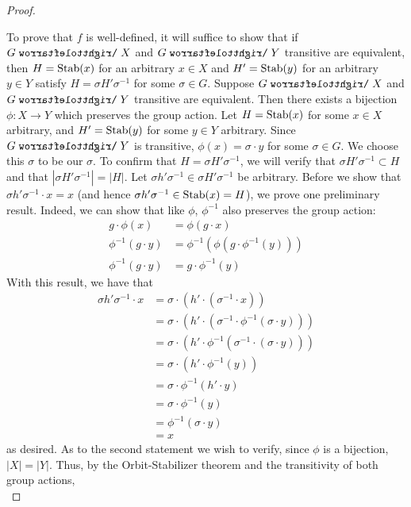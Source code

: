 \documentclass[../notes.tex]{subfiles}
\begin{document}
\begin{itemize}
\begin{proof}
\begin{enumerate}
        \end{enumerate}
        To prove that $f$ is well-defined, it will suffice to show that if $G\acts X$ and $G\acts Y$ transitive are equivalent, then $H=\operatorname{Stab}(x)$ for an arbitrary $x\in X$ and $H'=\operatorname{Stab}(y)$ for an arbitrary $y\in Y$ satisfy $H=\sigma H'\sigma^{-1}$ for some $\sigma\in G$. Suppose $G\acts X$ and $G\acts Y$ transitive are equivalent. Then there exists a bijection $\phi:X\to Y$ which preserves the group action. Let $H=\operatorname{Stab}(x)$ for some $x\in X$ arbitrary, and $H'=\operatorname{Stab}(y)$ for some $y\in Y$ arbitrary. Since $G\acts Y$ is transitive, $\phi(x)=\sigma\cdot y$ for some $\sigma\in G$. We choose this $\sigma$ to be our $\sigma$. To confirm that $H=\sigma H'\sigma^{-1}$, we will verify that $\sigma H'\sigma^{-1}\subset H$ and that $|\sigma H'\sigma^{-1}|=|H|$. Let $\sigma h'\sigma^{-1}\in\sigma H'\sigma^{-1}$ be arbitrary. Before we show that $\sigma h'\sigma^{-1}\cdot x=x$ (and hence $\sigma h'\sigma^{-1}\in\operatorname{Stab}(x)=H$), we prove one preliminary result. Indeed, we can show that like $\phi$, $\phi^{-1}$ also preserves the group action:
        \begin{align*}
            g\cdot\phi(x) &= \phi(g\cdot x)\\
            \phi^{-1}(g\cdot y) &= \phi^{-1}(\phi(g\cdot\phi^{-1}(y)))\\
            \phi^{-1}(g\cdot y) &= g\cdot\phi^{-1}(y)
        \end{align*}
        With this result, we have that
        \begin{align*}
            \sigma h'\sigma^{-1}\cdot x &= \sigma\cdot(h'\cdot(\sigma^{-1}\cdot x))\\
            &= \sigma\cdot(h'\cdot(\sigma^{-1}\cdot\phi^{-1}(\sigma\cdot y)))\\
            &= \sigma\cdot(h'\cdot\phi^{-1}(\sigma^{-1}\cdot(\sigma\cdot y)))\\
            &= \sigma\cdot(h'\cdot\phi^{-1}(y))\\
            &= \sigma\cdot\phi^{-1}(h'\cdot y)\\
            &= \sigma\cdot\phi^{-1}(y)\\
            &= \phi^{-1}(\sigma\cdot y)\\
            &= x
        \end{align*}
        as desired. As to the second statement we wish to verify, since $\phi$ is a bijection, $|X|=|Y|$. Thus, by the Orbit-Stabilizer theorem and the transitivity of both group actions,
        \begin{equation*}

\end{equation*}
\end{proof}
\end{itemize}
\end{document}
